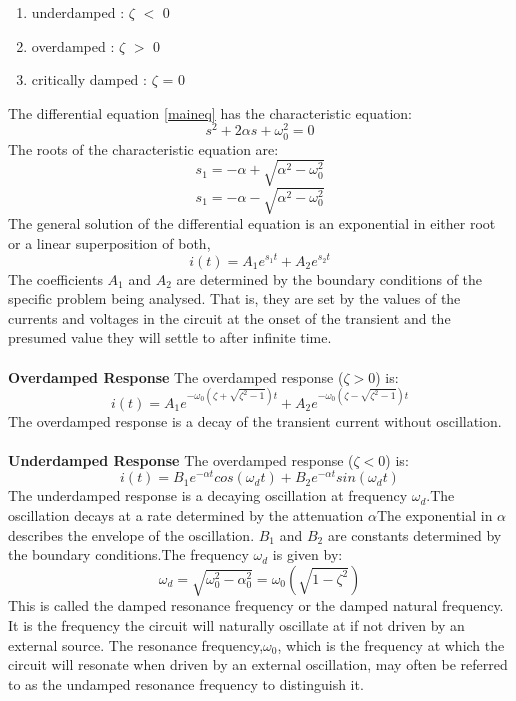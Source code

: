 \documentclass{article}
\begin{document}
\begin{enumerate}
\item underdamped : $\zeta$ $<$ 0
\item overdamped  : $\zeta$ $>$ 0
\item critically damped :  $\zeta$ = 0
\end{enumerate}
The differential equation \eqref{maineq} has the characteristic equation:\\
\begin{equation*}
s^2 +2\alpha s+\omega_0^2=0
\end{equation*}
The roots of the characteristic equation are:\\
\[s_1=-\alpha+\sqrt{\alpha^2-\omega_0^2}\]
\[s_1=-\alpha-\sqrt{\alpha^2-\omega_0^2}\]
The general solution of the differential equation is an exponential in either root or a linear superposition of both,\\
\[i(t)=A_1e^{s_1t}+A_2e^{s_2t}\]
The coefficients $A_1$ and $A_2$ are determined by the boundary conditions of the specific problem being analysed. That is, they are set by the values of the currents and voltages in the circuit at the onset of the transient and the presumed value they will settle to after infinite time.\\
\\
\textbf{Overdamped Response}
The overdamped response ($\zeta > 0$) is:\\
\[i(t)=A_1e^{-\omega_0(\zeta+\sqrt{\zeta^2-1})t}+A_2e^{-\omega_0(\zeta-\sqrt{\zeta^2 - 1})t}\]
The overdamped response is a decay of the transient current without oscillation.\\
\\
\textbf{Underdamped Response}
The overdamped response ($\zeta < 0$) is:\\
\[i(t)=B_1e^{-\alpha t}cos(\omega_d t) + B_2e^{-\alpha t}sin(\omega_d t)\]
The underdamped response is a decaying oscillation at frequency $\omega_d$.The oscillation decays at a rate determined by the attenuation $\alpha$The exponential in $\alpha$describes the envelope of the oscillation. $B_1$ and $B_2$ are constants determined by the boundary conditions.The frequency $\omega_d$ is given by:\\
\[\omega_d = \sqrt{\omega_0^2 - \alpha_0^2} = \omega_0\left(\sqrt{1-\zeta^2}\right)\]
This is called the damped resonance frequency or the damped natural frequency. It is the frequency the circuit will naturally oscillate at if not driven by an external source. The resonance frequency,$\omega_0$, which is the frequency at which the circuit will resonate when driven by an external oscillation, may often be referred to as the undamped resonance frequency to distinguish it.\\
\end{document}

